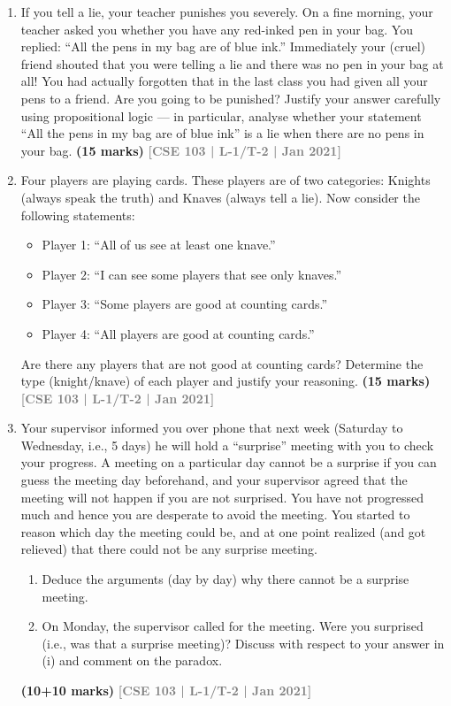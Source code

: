 \documentclass[12pt,a3paper]{article}
\newcommand{\yr}[1]{\hfill\textcolor{gray}{\small\textbf{[#1]}}}
\newcommand{\mk}[1]{\textcolor{orange!70!black}{\small\textbf{(#1 marks)}}}
\begin{document}
\begin{enumerate}
\item If you tell a lie, your teacher punishes you severely. On a fine morning, your teacher asked you whether you have any red-inked pen in your bag. You replied: ``All the pens in my bag are of blue ink.'' Immediately your (cruel) friend shouted that you were telling a lie and there was no pen in your bag at all! You had actually forgotten that in the last class you had given all your pens to a friend. Are you going to be punished? Justify your answer carefully using propositional logic — in particular, analyse whether your statement ``All the pens in my bag are of blue ink'' is a lie when there are no pens in your bag.
\mk{15} \yr{CSE 103 | L-1/T-2 | Jan 2021}

\item Four players are playing cards. These players are of two categories: Knights (always speak the truth) and Knaves (always tell a lie). Now consider the following statements:
\begin{itemize}[leftmargin=1.8em,itemsep=2pt,label={$\bullet$}]
  \item Player 1: ``All of us see at least one knave.''
  \item Player 2: ``I can see some players that see only knaves.''
  \item Player 3: ``Some players are good at counting cards.''
  \item Player 4: ``All players are good at counting cards.''
\end{itemize}
Are there any players that are not good at counting cards? Determine the type (knight/knave) of each player and justify your reasoning.
\mk{15} \yr{CSE 103 | L-1/T-2 | Jan 2021}

\item Your supervisor informed you over phone that next week (Saturday to Wednesday, i.e., 5 days) he will hold a ``surprise'' meeting with you to check your progress. A meeting on a particular day cannot be a surprise if you can guess the meeting day beforehand, and your supervisor agreed that the meeting will not happen if you are not surprised. You have not progressed much and hence you are desperate to avoid the meeting. You started to reason which day the meeting could be, and at one point realized (and got relieved) that there could not be any surprise meeting.
\begin{enumerate}
  \item Deduce the arguments (day by day) why there cannot be a surprise meeting.
  \item On Monday, the supervisor called for the meeting. Were you surprised (i.e., was that a surprise meeting)? Discuss with respect to your answer in (i) and comment on the paradox.
\end{enumerate}
\mk{10+10} \yr{CSE 103 | L-1/T-2 | Jan 2021}


\end{enumerate}
\end{document}
